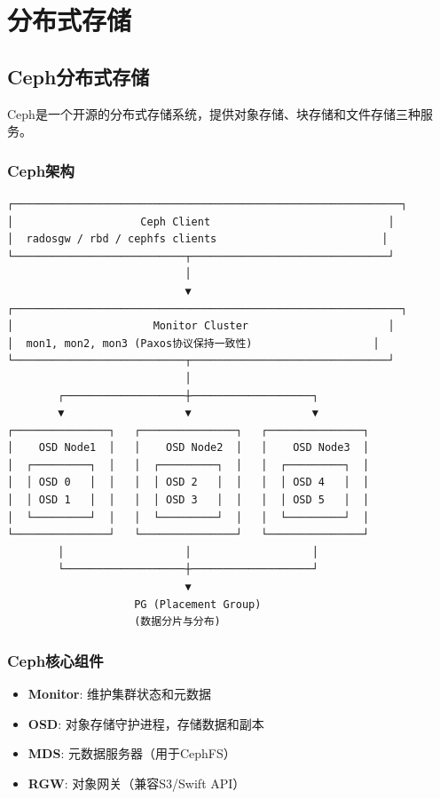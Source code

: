\documentclass[12pt,UTF8]{ctexbook}
\begin{document}
\chapter{分布式存储}
\label{chap:distributed-storage}

\section{Ceph分布式存储}
\label{sec:ceph}

Ceph是一个开源的分布式存储系统，提供对象存储、块存储和文件存储三种服务。

\subsection{Ceph架构}

\begin{lstlisting}
┌─────────────────────────────────────────────────────────────┐
│                    Ceph Client                            │
│  radosgw / rbd / cephfs clients                          │
└───────────────────────────┬───────────────────────────────┘
                            │
                            ▼
┌─────────────────────────────────────────────────────────────┐
│                      Monitor Cluster                      │
│  mon1, mon2, mon3 (Paxos协议保持一致性)                   │
└───────────────────────────┬───────────────────────────────┘
                            │
        ┌───────────────────┼───────────────────┐
        ▼                   ▼                   ▼
┌───────────────┐   ┌───────────────┐   ┌───────────────┐
│    OSD Node1  │   │    OSD Node2  │   │    OSD Node3  │
│  ┌─────────┐  │   │  ┌─────────┐  │   │  ┌─────────┐  │
│  │ OSD 0   │  │   │  │ OSD 2   │  │   │  │ OSD 4   │  │
│  │ OSD 1   │  │   │  │ OSD 3   │  │   │  │ OSD 5   │  │
│  └─────────┘  │   │  └─────────┘  │   │  └─────────┘  │
└───────────────┘   └───────────────┘   └───────────────┘
        │                   │                   │
        └───────────────────┼───────────────────┘
                            ▼
                    PG (Placement Group)
                    (数据分片与分布)
\end{lstlisting}

\subsection{Ceph核心组件}

\begin{itemize}
    \item \textbf{Monitor}: 维护集群状态和元数据
    \item \textbf{OSD}: 对象存储守护进程，存储数据和副本
    \item \textbf{MDS}: 元数据服务器（用于CephFS）
    \item \textbf{RGW}: 对象网关（兼容S3/Swift API）
\end{itemize}
\end{document}
